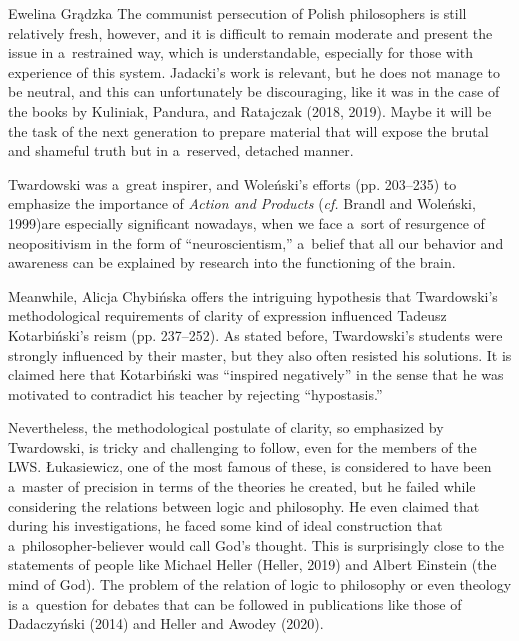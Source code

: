 \begin{newrevengenv}{Ewelina Grądzka}
The communist persecution of Polish philosophers is still relatively fresh, however, and it is difficult to remain moderate and present the issue in a~restrained way, which is understandable, especially for those with experience of this system. Jadacki's work is relevant, but he does not manage to be neutral, and this can unfortunately be discouraging, like it was in the case of the books by Kuliniak, Pandura, and Ratajczak (2018, 2019). Maybe it will be the task of the next generation to prepare material that will expose the brutal and shameful truth but in a~reserved, detached manner.

Twardowski was a~great inspirer, and Woleński's efforts (pp. 203–235) to emphasize the importance of \textit{Action and Products} (\textit{cf.} Brandl and Woleński, 1999)are especially significant nowadays, when we face a~sort of resurgence of neopositivism in the form of ``neuroscientism,'' a~belief that all our behavior and awareness can be explained by research into the functioning of the brain.

Meanwhile, Alicja Chybińska offers the intriguing hypothesis that Twardowski's methodological requirements of clarity of expression influenced Tadeusz Kotarbiński's reism (pp. 237–252). As stated before, Twardowski's students were strongly influenced by their master, but they also often resisted his solutions. It is claimed here that Kotarbiński was ``inspired negatively'' in the sense that he was motivated to contradict his teacher by rejecting ``hypostasis.''

Nevertheless, the methodological postulate of clarity, so emphasized by Twardowski, is tricky and challenging to follow, even for the members of the LWS. Łukasiewicz, one of the most famous of these, is considered to have been a~master of precision in terms of the theories he created, but he failed while considering the relations between logic and philosophy. He even claimed that during his investigations, he faced some kind of ideal construction that a~philosopher-believer would call God's thought. This is surprisingly close to the statements of people like Michael Heller (Heller, 2019) and Albert Einstein (the mind of God). The problem of the relation of logic to philosophy or even theology is a~question for debates that can be followed in publications like those of Dadaczyński (2014) and Heller and Awodey (2020).


\end{newrevengenv}
